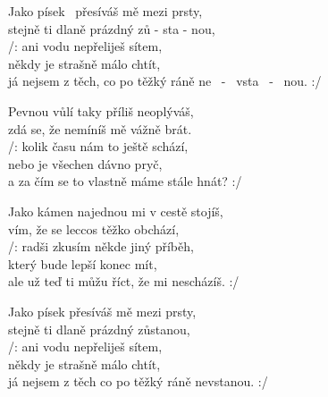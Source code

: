 
\ve{}
Jako písek \ přesíváš mě mezi prsty,\\
stejně ti dlaně prázdný zů - sta - nou,\\
/: ani vodu nepřeliješ sítem,\\
někdy je strašně málo chtít,\\
já nejsem z těch, co po těžký ráně ne \ - \ vsta \ - \ nou. :/

\ve{}
Pevnou vůlí taky příliš neoplýváš,\\
zdá se, že nemíníš mě vážně brát.\\
/: kolik času nám to ještě schází,\\
nebo je všechen dávno pryč,\\
a za čím se to vlastně máme stále hnát? :/

\ve{}
Jako kámen najednou mi v cestě stojíš,\\
vím, že se leccos těžko obchází,\\
/: radši zkusím někde jiný příběh,\\
který bude lepší konec mít,\\
ale už teď ti můžu říct, že mi nescházíš. :/

\ve{}
Jako písek přesíváš mě mezi prsty,\\
stejně ti dlaně prázdný zůstanou,\\
/: ani vodu nepřeliješ sítem,\\
někdy je strašně málo chtít,\\
já nejsem z těch co po těžký ráně nevstanou. :/

\esong